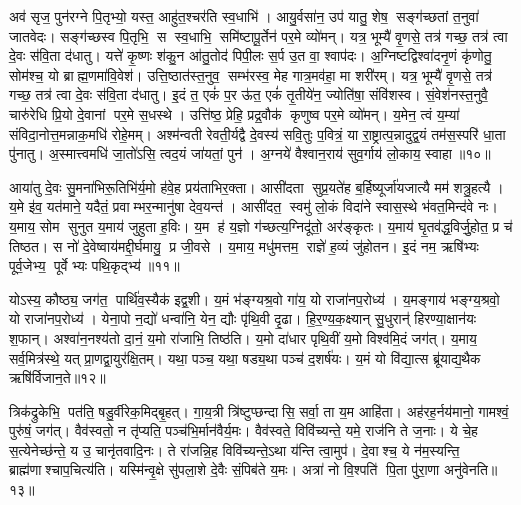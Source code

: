 अव॑ सृज॒ पुन॑रग्ने पि॒तृभ्यो॒ यस्त॒ आहु॑त॒श्चर॑ति स्व॒धाभि॑। आयु॒र्वसा॑न॒ उप॑ यातु॒ शेष॒ सङ्ग॑च्छतां त॒नुवा॑ जातवेदः। सङ्ग॑च्छस्व पि॒तृभि॒ स स्व॒धाभि॒ समि॑ष्टापू॒र्तेन॑ पर॒मे व्यो॑मन्। यत्र॒ भूम्यै॑ वृ॒णसे॒ तत्र॑ गच्छ॒ तत्र॑ त्वा दे॒वः स॑वि॒ता द॑धातु। यत्ते॑ कृ॒ष्णः  श॑कु॒न आ॑तु॒तोद॑ पिपी॒लः स॒र्प उ॒त वा॒ श्वाप॑दः। अ॒ग्निष्टद्विश्वा॑दनृ॒णं कृ॑णोतु॒ सोम॑श्च॒ यो ब्राह्म॒णमा॑वि॒वेश॑। उत्ति॒ष्ठात॑स्त॒नुव॒ सम्भ॑रस्व॒ मेह गात्र॒मव॑हा॒ मा शरी॑रम्। यत्र॒ भूम्यै॑ वृ॒णसे॒ तत्र॑ गच्छ॒ तत्र॑ त्वा दे॒वः स॑वि॒ता द॑धातु। इ॒दं त॒ एकं॑ प॒र ऊ॑त॒ एकं॑ तृ॒तीये॑न॒ ज्योति॑षा॒ संवि॑शस्व। सं॒वेश॑नस्त॒नुवै॒ चारु॑रेधि प्रि॒यो दे॒वानां पर॒मे स॒धस्थे। उत्ति॑ष्ठ॒ प्रेहि॒ प्रद्र॒वौक॑ कृणुष्व पर॒मे व्यो॑मन्। य॒मेन॒ त्वं य॒म्या॑ संविदा॒नोत्त॒मन्नाक॒मधि॑ रोहे॒मम्। अश्म॑न्वती रेवती॒र्यद्वै दे॒वस्य॑ सवि॒तुः प॒वित्रं॒ या रा॒ष्ट्रात्प॒न्नादुद्व॒यं तम॑स॒स्परि॑ धा॒ता पु॑नातु। अ॒स्मात्त्वमधि॑ जा॒तो॑ऽसि॒ त्वद॒यं जा॑यतां॒ पुन॑। अ॒ग्नये॑ वैश्वान॒राय॑ सुव॒र्गाय॑ लो॒काय॒ स्वाहा॥१०॥
\anuvakamend[अव॑शीयता स॒धस्थे॒ पञ्च॑ च]

आया॑तु दे॒वः सु॒मना॑भिरू॒तिभि॑र्य॒मो ह॑वे॒ह प्रय॑ताभिर॒क्ता। आसी॑दता सुप्र॒यते॑ह ब॒र्\mbox{}हिष्यूर्जा॑यजात्यै मम॑ शत्रु॒हत्यै। य॒मे इ॑व॒ यत॑माने॒ यदैतं॒ प्रवाम्भर॒न्मानु॑षा देव॒यन्त॑। आसी॑दत॒ स्वमु॑ लो॒कं  विदा॑ने स्वास॒स्थे भ॑वत॒मिन्द॑वे नः। य॒माय॒ सोम सुनुत य॒माय॑ जुहुता ह॒विः। य॒म ह॑ य॒ज्ञो ग॑च्छत्य॒ग्निदू॑तो॒ अर॑ङ्कृतः। य॒माय॑ घृ॒तव॑द्ध॒विर्जु॒होत॒ प्र च॑ तिष्ठत। स नो॑ दे॒वेष्वाय॑मद्दी॒र्घमायु॒ प्र जी॒वसे। य॒माय॒ मधु॑मत्तम॒ राज्ञे॑ ह॒व्यं जु॑होतन। इ॒दं नम॒ ऋषि॑भ्यः पूर्व॒जेभ्य॒ पूर्वेभ्यः पथि॒कृद्भ्य॑॥११॥

योऽस्य॒ कौष्ठ्य॒ जग॑त॒ पार्थि॑व॒स्यैक॑ इद्व॒शी। य॒मं भ॑ङ्ग्यश्र॒वो गा॑य॒ यो राजा॑नप॒रोध्य॑। य॒मङ्गाय॑ भङ्ग्य॒श्रवो॒ यो राजा॑नप॒रोध्य॑। येना॒पो न॒द्यो॑ धन्वा॑नि॒ येन॒ द्यौः पृ॑थि॒वी दृ॒ढा। हि॒र॒ण्य॒क॒क्ष्यान् सु॒धुरान्॑ हिरण्या॒क्षान॑यः  श॒फान्। अश्वा॑न॒नश्य॑तो दा॒नं॒ य॒मो रा॑जाभि॒ तिष्ठ॑ति। य॒मो दा॑धार पृथि॒वीं य॒मो विश्व॑मि॒दं जग॑त्। य॒माय॒ सर्व॒मित्र॑स्थे॒ यत् प्रा॒णद्वा॒युर॑क्षि॒तम्। यथा॒ पञ्च॒ यथा॒ षड्य॒था पञ्च॑ द॒शर्\mbox{}ष॑यः। य॒मं यो वि॑द्या॒त्स ब्रू॑याद्य॒थैक ऋषि॑र्विजान॒ते॥१२॥

त्रिक॑द्रुकेभि॒ पत॑ति॒ षडु॒र्वीरेक॒मिद्बृ॒हत्। गा॒य॒त्री त्रि॑ष्टुप्छन्दासि॒ सर्वा॒ ता य॒म आहि॑ता। अह॑रह॒र्नय॑मानो॒ गामश्वं॒ पुरु॑षं॒ जग॑त्। वैव॑स्वतो॒ न तृ॑प्यति॒ पञ्च॑भि॒र्मान॑वैर्य॒मः। वैव॑स्वते॒ विवि॑च्यन्ते॒ यमे॒ राज॑नि ते ज॒नाः। ये चे॒ह स॒त्येनेच्छ॑न्ते॒ य उ॒ चानृ॑तवादि॒नः। ते रा॑जन्नि॒ह विवि॑च्यन्ते॒ऽथा य॑न्ति त्वा॒मुप॑। दे॒वाश्च॒ ये न॑म॒स्यन्ति॒ ब्राह्म॑णाश्चाप॒चित्य॑ति। यस्मि॑न्वृ॒क्षे सु॑पला॒शे दे॒वैः सं॒पिब॑ते य॒मः। अत्रा॑ नो वि॒श्पति॑ पि॒ता पु॑रा॒णा अनु॑वेनति॥१३॥
\anuvakamend[प॒थि॒कृद्भ्यो॑ विजान॒तेऽनु॑ वेनति]

